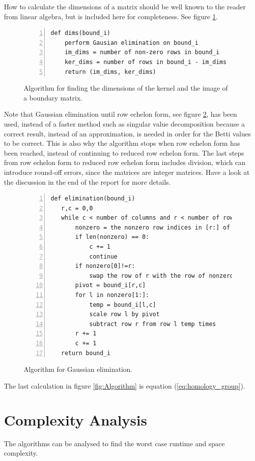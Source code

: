 \documentclass[11pt,a4paper,twoside]{report}
\begin{document}
How to calculate the dimensions of a matrix should be well known to the reader from linear algebra, but is included here for completeness. See figure \ref{fig:Algorithm_dims}.
\begin{figure}[H]
\begin{lstlisting}[numbers=left]
def dims(bound_i)
    perform Gausian elimination on bound_i
    im_dims = number of non-zero rows in bound_i
    ker_dims = number of rows in bound_i - im_dims
    return (im_dims, ker_dims)
\end{lstlisting}
\caption{Algorithm for finding the dimensions of the kernel and the image of a boundary matrix.}
\label{fig:Algorithm_dims}
\end{figure}
Note that Gaussian elimination until row echelon form, see figure \ref{fig:Algorithm_gauss}, has been used, instead of a faster method such as singular value decomposition because a correct result, instead of an approximation, is needed in order for the Betti values to be correct. This is also why the algorithm stops when row echelon form has been reached, instead of continuing to reduced row echelon form. The last steps from row echelon form to reduced row echelon form includes division, which can introduce round-off errors, since the matrices are integer matrices. Have a look at the discussion in the end of the report for more details.
\begin{figure}[H]
\begin{lstlisting}[numbers=left]
def elimination(bound_i)
   r,c = 0,0
   while c < number of columns and r < number of rows:
       nonzero = the nonzero row indices in [r:] of column c
       if len(nonzero) == 0:
           c += 1
           continue
       if nonzero[0]!=r:
           swap the row of r with the row of nonzero
       pivot = bound_i[r,c]
       for l in nonzero[1:]:
           temp = bound_i[l,c]
           scale row l by pivot
           subtract row r from row l temp times
       r += 1
       c += 1
   return bound_i
\end{lstlisting}
\caption{Algorithm for Gaussian elimination.}
\label{fig:Algorithm_gauss}
\end{figure}
The last calculation in figure \ref{fig:Algorithm} is equation (\ref{eq:homology_group}).
\section{Complexity Analysis}
The algorithms can be analysed to find the worst case runtime and space complexity. 
\end{document}
